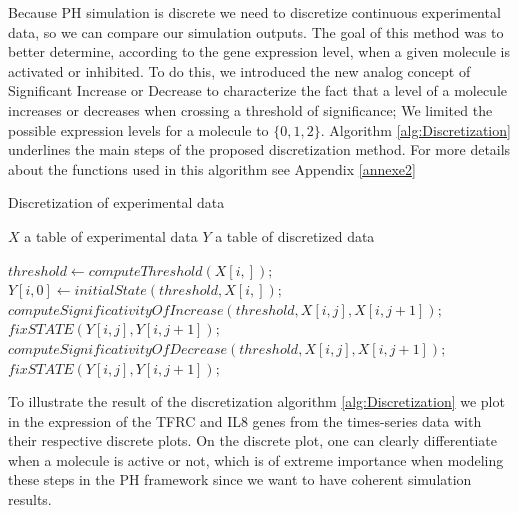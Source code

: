 \documentclass[11pt,a4paper,twoside]{epig}
\begin{document}
Because PH simulation is discrete we need to discretize continuous experimental data, so we can compare our simulation outputs.
The goal of this method was to better determine, according to the gene expression level, when  a given molecule is activated or inhibited.
To do this, we introduced the new analog concept of Significant Increase or Decrease to characterize the fact that a level of a molecule 
increases or decreases when crossing a threshold of significance; We limited the possible expression levels for a molecule to
$\{0, 1, 2\}$. Algorithm \ref{alg:Discretization} underlines the main steps of the proposed discretization method. For more details about the 
functions used in this algorithm see Appendix \ref{annexe2}
\begin{algorithm}
\caption{Discretization of experimental data}
\label{alg:Discretization}
\begin{algorithmic}
\REQUIRE $X$ a table of experimental data
\ENSURE $Y$ a table of discretized data

\STATE $threshold \leftarrow computeThreshold(X[i,]);$
\STATE $Y[i,0] \leftarrow initialState(threshold,X[i,]);$
   \STATE $computeSignificativityOfIncrease(threshold,X[i,j],X[i,j+1]);$
   \STATE $fixSTATE(Y[i,j],Y[i,j+1]);$
  \ELSE
   \STATE $computeSignificativityOfDecrease(threshold,X[i,j],X[i,j+1]);$
   \STATE $fixSTATE(Y[i,j],Y[i,j+1]);$
  \ENDIF
\ENDFOR

\ENDFOR

\end{algorithmic}
\end{algorithm}

To illustrate the result of the discretization algorithm \ref{alg:Discretization} we plot in  the expression 
of the TFRC and IL8 genes from the times-series data with their respective discrete plots. 
On the discrete plot, one can clearly differentiate when a molecule is active or not, which is of extreme importance 
when modeling these steps in the PH framework since we want to have coherent simulation results.
\end{document}
